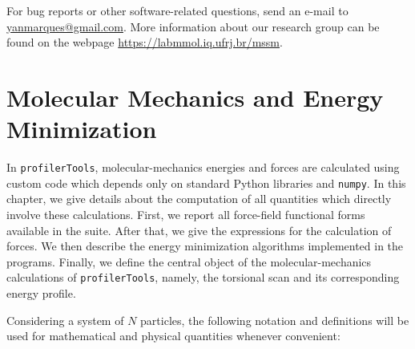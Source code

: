 \documentclass[10pt,a4paper,openany]{memoir}
\numberwithin{equation}{section}
\newcommand{\profilertools}[0]{\texttt{profilerTools}}
\begin{document}
  For bug reports or other software-related questions, send an e-mail
  to \url{yanmarques@gmail.com}.  More information about our research
  group can be found on the webpage
  \url{https://labmmol.iq.ufrj.br/mssm}.

\tableofcontents

  \mainmatter

\newcommand*{\profi}{\texttt{profilerOpt}}

\chapter{Molecular Mechanics and Energy Minimization}
\label{chap:mm}

In \profilertools{}, molecular-mechanics energies and forces are calculated using custom code which depends only on standard Python libraries and \texttt{numpy}.
In this chapter, we give details about the computation of all quantities which directly involve these calculations.
First, we report all force-field functional forms available in the suite.
After that, we give the expressions for the calculation of forces.
We then describe the energy minimization algorithms implemented in the programs.
Finally, we define the central object of the molecular-mechanics calculations of \profilertools{}, namely, the torsional scan and its corresponding energy profile.

Considering a system of $N$ particles, the following notation and definitions will be used for mathematical and physical quantities whenever convenient:
\end{document}
